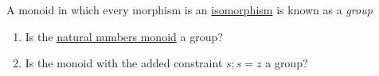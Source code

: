 A monoid in which every morphism is an \hyperref[D3.28]{isomorphism} is known as a \emph{group}
    \begin{enumerate}
      \item Is the \hyperref[X3.13]{natural numbers monoid} a group?
      \item  Is the monoid with the added constraint $s;s=z$  a group?
    \end{enumerate}